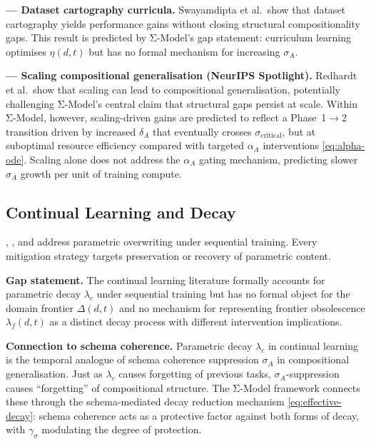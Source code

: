 \documentclass[11pt,a4paper]{article}
\begin{document}
\textbf{\cite{swayamdipta2020datasetcartography} --- Dataset cartography curricula.}
Swayamdipta et al.\ show that dataset cartography yields performance
gains without closing structural compositionality gaps. This result is
predicted by Σ-Model's gap statement: curriculum learning optimises
$\eta(d,t)$ but has no formal mechanism for increasing $\sigma_A$.

\textbf{\cite{redhardt2025} --- Scaling compositional generalisation (NeurIPS Spotlight).}
Redhardt et al.~show that scaling can lead to compositional generalisation,
potentially challenging Σ-Model's central claim that structural gaps persist at
scale. Within Σ-Model, however, scaling-driven gains are predicted to reflect a
Phase~1$\to$2 transition driven by increased $\delta_A$ that eventually crosses
$\sigma_{\text{critical}}$, but at suboptimal resource efficiency compared with
targeted $\alpha_A$ interventions \eqref{eq:alpha-ode}. Scaling alone does not
address the $\alpha_A$ gating mechanism, predicting slower $\sigma_A$ growth per
unit of training compute.

\subsection{Continual Learning and Decay}\label{sec:continual-learning}

\cite{mccloskey1989catastrophicinterference},
\cite{goodfellow2013empiricalinvestigationcatastrophicforgetting}, and
\cite{kirkpatrick2017overcomingcatastrophicforgetting} address parametric
overwriting under sequential training. Every mitigation strategy targets
preservation or recovery of parametric content.

\textbf{Gap statement.} The continual learning literature formally
accounts for parametric decay $\lambda_c$ under sequential training but
has no formal object for the domain frontier $\Delta(d,t)$ and no
mechanism for representing frontier obsolescence $\lambda_f(d,t)$ as a
distinct decay process with different intervention implications.

\textbf{Connection to schema coherence.} Parametric decay $\lambda_c$ in
continual learning is the temporal analogue of schema coherence suppression
$\sigma_A$ in compositional generalisation. Just as $\lambda_c$ causes
forgetting of previous tasks, $\sigma_A$-suppression causes ``forgetting''
of compositional structure. The Σ-Model framework connects these through the
schema-mediated decay reduction mechanism \eqref{eq:effective-decay}:
schema coherence acts as a protective factor against both forms of decay,
with $\gamma_\sigma$ modulating the degree of protection.
\end{document}
